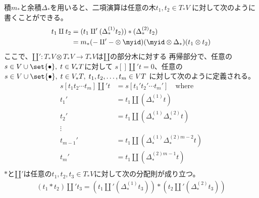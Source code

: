 	積$m_*$と余積$\Delta_*$を用いると、二項演算は任意の木$t_1,t_2\in T_*V$
	に対して次のように書くことができる。
	\begin{equation}\begin{split} %
		t_1\amalg t_2 &= (t_1\amalg' (\Delta_*^{(1)}t_2)) * (\Delta_*^{(2)}t_2) \\
			&= m_*(-\amalg'-\otimes \myid)(\myid\otimes \Delta_*)(t_1\otimes t_2) \\
	\end{split}\end{equation} %
	ここで、$\amalg':T_*V\otimes T_*V\to T_*V$は$\amalg$の部分木に対する
	再帰部分で、任意の$s\in V\cup\set{\bullet},\;t\in V_*T$に対して
	$s[]\amalg't=0$、任意の
	$s\in V\cup\set{\bullet},\;t\in V_*T,\;t_1,t_2,\dots,t_m\in VT$
	に対して次のように定義される。
	\begin{equation}\begin{split} %
		s[t_1t_2\cdots t_m]\amalg't &= s[t_1't_2'\cdots t_m']\quad\text{where} \\
		t_1' &= t_1\amalg(\Delta_*^{(1)}t) \\
		t_2' &= t_1\amalg(\Delta_*^{(1)}\Delta_*^{(2)}t) \\
		\vdots \\
		t_{m-1}' &= t_1\amalg(\Delta_*^{(1)}\Delta_*^{(2)m-2}t) \\
		t_m' &= t_1\amalg(\Delta_*^{(2)m-1}t) \\
	\end{split}\end{equation} %
	$*$と$\amalg'$は任意の$t_1,t_2,t_3\in T_*V$に対して次の分配則が成り立つ。
	\begin{equation}\label{eq:木の分配則その一}\begin{split} %
		(t_1*t_2)\amalg't_3 = \left(t_1\amalg'(\Delta_*^{(1)}t_3)\right)
			*\left(t_2\amalg'(\Delta_*^{(2)}t_3)\right)
	\end{split}\end{equation} %

